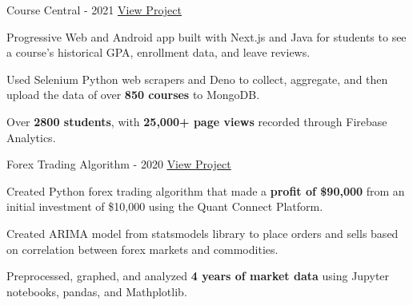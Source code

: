 

\begin{cventries}

  \cventry
    {} %
    {Course Central - 2021} %
    {\href{https://coursecentral.ca/}{\underline{View Project}}} %
    {} %
    {
      \begin{cvitems} %
        \item {Progressive Web and Android app built with Next.js and Java for students to see a course's historical GPA, enrollment data, and leave reviews.}
        \item {Used Selenium Python web scrapers and Deno to collect, aggregate, and then upload the data of over \textbf{850 courses} to MongoDB.}
        \item {Over \textbf{2800 students}, with \textbf{25,000+ page views} recorded through Firebase Analytics.}
      \end{cvitems}
    }

  \cventry
    {} %
    {Forex Trading Algorithm - 2020} %
    {\href{https://github.com/KnlnKS/Forex-Price-Predictor-Quantconnect}{\underline{View Project}}} %
    {} %
    {
      \begin{cvitems} %
        \item {Created Python forex trading algorithm that made a \textbf{profit of \$90,000} from an initial investment of \$10,000 using the Quant Connect Platform.}
        \item {Created ARIMA model from statsmodels library to place orders and sells based on correlation between forex markets and commodities.}
        \item {Preprocessed, graphed, and analyzed \textbf{4 years of market data} using Jupyter notebooks, pandas, and Mathplotlib.}
      \end{cvitems}
    }


\end{cventries}
